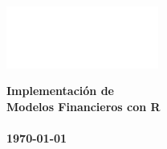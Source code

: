 \begin{titlepage}
\pagecolor{titlepagecolor}
\noindent
\includegraphics[width=5cm]{./img/vision-white.png}\\[-1em]
\color{white}
\makebox[0pt][l]{\rule{1.3\textwidth}{1pt}}
\par
\noindent
\Huge\textbf{Implementación de} \\
\Huge\textbf{Modelos Financieros con R} \\ \\
\vfill
\noindent
\small{\textbf{\today}} \\ \\
\end{titlepage}
\restoregeometry %
\nopagecolor%
